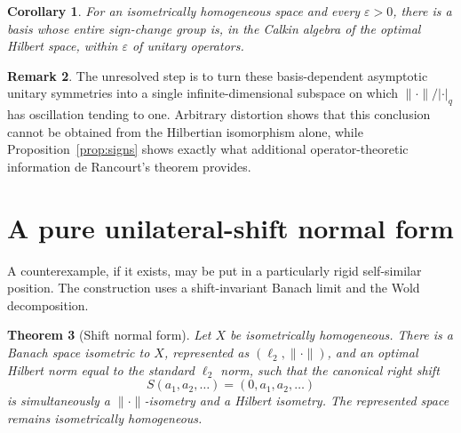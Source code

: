 \documentclass[11pt]{article}
\newtheorem{theorem}{Theorem}[section]
\newtheorem{corollary}[theorem]{Corollary}
\theoremstyle{definition}
\newtheorem{remark}[theorem]{Remark}
\begin{document}
\begin{corollary}
For an isometrically homogeneous space and every $\varepsilon>0$, there is a
basis whose entire sign-change group is, in the Calkin algebra of the optimal
Hilbert space, within $\varepsilon$ of unitary operators.
\end{corollary}

\begin{remark}
The unresolved step is to turn these basis-dependent asymptotic unitary
symmetries into a single infinite-dimensional subspace on which
$\|\cdot\|/|\cdot|_q$ has oscillation tending to one.  Arbitrary distortion
shows that this conclusion cannot be obtained from the Hilbertian isomorphism
alone, while Proposition~\ref{prop:signs} shows exactly what additional
operator-theoretic information de Rancourt's theorem provides.
\end{remark}

\section{A pure unilateral-shift normal form}\label{sec:shift}

A counterexample, if it exists, may be put in a particularly rigid self-similar
position.  The construction uses a shift-invariant Banach limit and the Wold
decomposition.

\begin{theorem}[Shift normal form]\label{thm:shift}
Let $X$ be isometrically homogeneous.  There is a Banach space isometric to
$X$, represented as $(\ell_2,\|\cdot\|)$, and an optimal Hilbert norm equal to
the standard $\ell_2$ norm, such that the canonical right shift
\[
 S(a_1,a_2,\ldots)=(0,a_1,a_2,\ldots)
\]
is simultaneously a $\|\cdot\|$-isometry and a Hilbert isometry.  The
represented space remains isometrically homogeneous.
\end{theorem}
\end{document}
